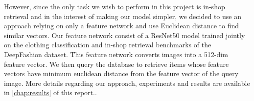 However, since the only task we wish to perform in this project is in-shop retrieval and in the interest of making our model simpler, we decided to use an approach relying on only a feature network and use Euclidean distance to find similar vectors. Our feature network consist of a ResNet50 model trained jointly on the clothing classification and in-shop retrieval benchmarks of the DeepFashion dataset. This feature network converts images into a 512-dim feature vector. We then query the database to retrieve items whose feature vectors have minimum euclidean distance from the feature vector of the query image. More details regarding our approach, experiments and results are available in \autoref{chap:results} of this report.. 

